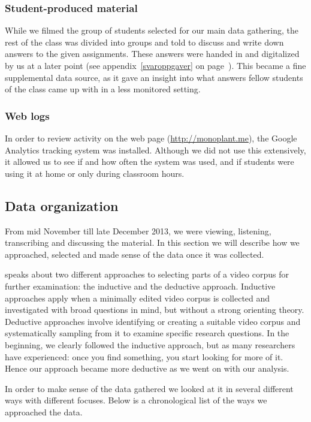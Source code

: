 \subsubsection{Student-produced material}
While we filmed the group of students selected for our main data gathering, the rest of the class was divided into groups and told to discuss and write down answers to the given assignments. These answers were handed in and digitalized by us at a later point (see appendix~\ref{svaroppgaver} on page~\pageref{svaroppgaver}). This became a fine supplemental data source, as it gave an insight into what answers fellow students of the class came up with in a less monitored setting. 

\subsubsection{Web logs}
In order to review activity on the web page (\url{http://monoplant.me}), the Google Analytics tracking system was installed. Although we did not use this extensively, it allowed us to see if and how often the system was used, and if students were using it at home or only during classroom hours. 

\subsection{Data organization}
From mid November till late December 2013, we were viewing, listening, transcribing and discussing the material. In this section we will describe how we approached, selected and made sense of the data once it was collected.

\citet{derry2010conducting} speaks about two different approaches to selecting parts of a video corpus for further examination: the inductive and the deductive approach. Inductive approaches apply when a minimally edited video corpus is collected and investigated with broad questions in mind, but without a strong orienting theory. Deductive approaches involve identifying or creating a suitable video corpus and systematically sampling from it to examine specific research questions. \citep{derry2010conducting} In the beginning, we clearly followed the inductive approach, but as many researchers have experienced: once you find something, you start looking for more of it. Hence our approach became more deductive as we went on with our analysis.

In order to make sense of the data gathered we looked at it in several different ways with different focuses. Below is a chronological list of the ways we approached the data. 

